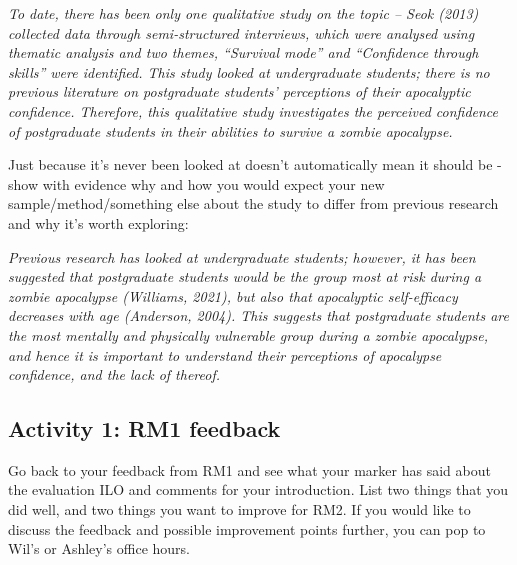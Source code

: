 \documentclass[
  english,
  letterpaper,
  DIV=11,
  numbers=noendperiod]{scrreprt}
\begin{document}
\begin{tcolorbox}[enhanced jigsaw, breakable, bottomtitle=1mm, leftrule=.75mm, opacityback=0, colbacktitle=quarto-callout-caution-color!10!white, opacitybacktitle=0.6, toprule=.15mm, colback=white, left=2mm, coltitle=black, bottomrule=.15mm, titlerule=0mm, title={Show me Example 3: Why is your study worth doing?}, toptitle=1mm, colframe=quarto-callout-caution-color-frame, arc=.35mm, rightrule=.15mm]

\emph{To date, there has been only one qualitative study on the topic --
Seok (2013) collected data through semi-structured interviews, which
were analysed using thematic analysis and two themes, ``Survival mode''
and ``Confidence through skills'' were identified. This study looked at
undergraduate students; there is no previous literature on postgraduate
students' perceptions of their apocalyptic confidence. Therefore, this
qualitative study investigates the perceived confidence of postgraduate
students in their abilities to survive a zombie apocalypse.}

Just because it's never been looked at doesn't automatically mean it
should be - show with evidence why and how you would expect your new
sample/method/something else about the study to differ from previous
research and why it's worth exploring:

\emph{Previous research has looked at undergraduate students; however,
it has been suggested that postgraduate students would be the group most
at risk during a zombie apocalypse (Williams, 2021), but also that
apocalyptic self-efficacy decreases with age (Anderson, 2004). This
suggests that postgraduate students are the most mentally and physically
vulnerable group during a zombie apocalypse, and hence it is important
to understand their perceptions of apocalypse confidence, and the lack
of thereof.}

\end{tcolorbox}

\subsection{Activity 1: RM1 feedback}\label{activity-1-rm1-feedback}

Go back to your feedback from RM1 and see what your marker has said
about the evaluation ILO and comments for your introduction. List two
things that you did well, and two things you want to improve for RM2. If
you would like to discuss the feedback and possible improvement points
further, you can pop to Wil's or Ashley's office hours.
\end{document}
